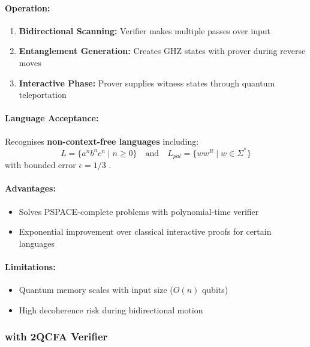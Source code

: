 \paragraph{Operation:}
\begin{enumerate}
    \item \textbf{Bidirectional Scanning:} Verifier makes multiple passes over input
    \item \textbf{Entanglement Generation:} Creates GHZ states with prover during reverse moves
    \item \textbf{Interactive Phase:} Prover supplies witness states through quantum teleportation
\end{enumerate}

\paragraph{Language Acceptance:}
Recognises \textbf{non-context-free languages} including:
\[
L = \{a^nb^nc^n \mid n \geq 0\} \quad \text{and} \quad L_{pal} = \{ww^R \mid w \in \Sigma^*\}
\]
with bounded error $\epsilon = 1/3$ \cite{zheng2012two}.

\paragraph{Advantages:}
\begin{itemize}
    \item Solves PSPACE-complete problems with polynomial-time verifier
    \item Exponential improvement over classical interactive proofs for certain languages
\end{itemize}

\paragraph{Limitations:}
\begin{itemize}
    \item Quantum memory scales with input size ($O(n)$ qubits)
    \item High decoherence risk during bidirectional motion
\end{itemize}

\subsubsection{ with 2QCFA Verifier}
\label{subsec:qmip2qcfa}

